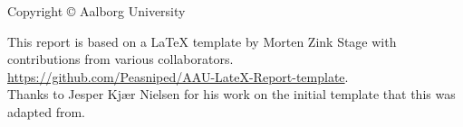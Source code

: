 \thispagestyle{empty}
{\small
\strut\vfill %
\noindent Copyright \copyright{}\mySemesterYear{} Aalborg University\\
\par
\noindent This report is based on a LaTeX template by Morten Zink Stage with contributions from various collaborators.\\
\url{https://github.com/Peasniped/AAU-LateX-Report-template}.\\
Thanks to Jesper Kjær Nielsen for his work on the initial template that this was adapted from.\par
\vspace{0.2cm}
\noindent \myColophon
}

\clearpage